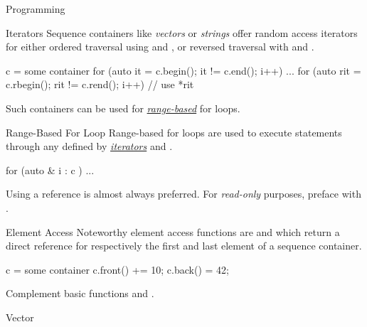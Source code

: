 \documentclass{cognito}
\begin{document}
\lstset{language=C}
\lstset{mathescape=true}


\begin{note}{Programming}
\end{note}

\begin{note}{Iterators}
	Sequence containers like {\it vectors} or {\it strings} offer random access iterators for
	either ordered traversal using  and ,
	or reversed traversal with  and .
	
	\begin{largecode}
 c = some container
 for (auto it = c.begin(); it != c.end(); i++) ...
 for (auto rit = c.rbegin(); rit != c.rend(); i++)
 	// use *rit
	\end{largecode}
	\begin{remark}
		Such containers can be used for \hyperref[note:Range-Based For Loop]{\it range-based} for loops.
	\end{remark}
	\vspace{-5pt}
\end{note}

\begin{note}{Range-Based For Loop}
	Range-based for loops are used to execute statements through any 
	defined by \hyperref[note:Iterators]{\it iterators}  and .
	
	\begin{largecode}
 for (auto & i : c ) ...
	\end{largecode}
	\begin{remark} Using a reference \incode{\&} is almost always preferred.
		For {\it read-only} purposes, preface with .
	\end{remark}\vspace{-5pt}
\end{note}


\begin{note}{Element Access}
	Noteworthy element access functions are  and 
	which return a direct reference for respectively the first and last element of a sequence
	container.
	
	\begin{largecode}
 c = some container
 c.front() += 10;
 c.back() = 42;
	\end{largecode}
	\begin{remark} Complement basic functions  and . \end{remark}
	\vspace{-5pt}
\end{note} 

\begin{note}{Vector}
\end{note}
\end{document}
